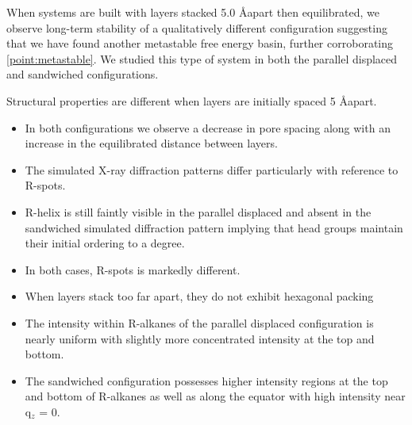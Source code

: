 \documentclass{article}
\newcommand{\angstrom}{\textup{\AA}}
\begin{document}
  When systems are built with layers stacked 5.0 \angstrom apart then equilibrated, 
  we observe long-term stability of a qualitatively different configuration
  suggesting that we have found another metastable free energy basin,
  further corroborating \ref{point:metastable}. We studied this type of system in
  both the parallel displaced and sandwiched configurations. 

  Structural properties are different when layers are initially spaced 5 \AA apart.
  \begin{itemize}
	\item In both configurations we observe a decrease in pore spacing along with an increase in the equilibrated distance between layers.
	\item The simulated X-ray diffraction patterns differ particularly with reference to R-spots.
	\item R-helix is still faintly visible in the parallel displaced and absent in the sandwiched simulated diffraction pattern implying that head groups maintain their initial ordering to a degree.
	\item In both cases, R-spots is markedly different.
	\item When layers stack too far apart, they do not exhibit hexagonal packing
	\item The intensity within R-alkanes of the parallel displaced configuration is nearly uniform with slightly more concentrated intensity at the top and bottom.
	\item The sandwiched configuration possesses higher intensity regions at the top and bottom of R-alkanes as well as along the equator with high intensity near q$_z$ = 0.
  \end{itemize}
\end{document}
